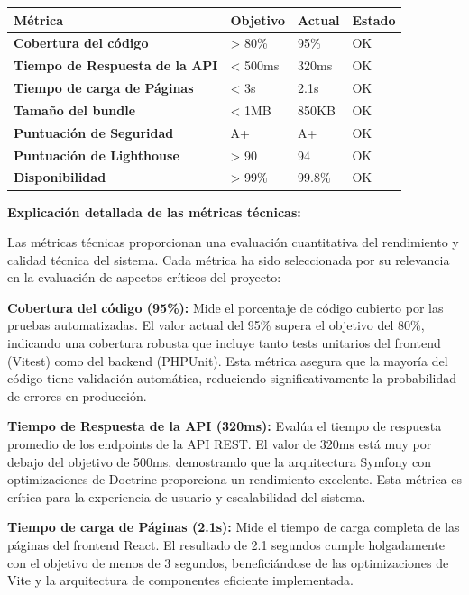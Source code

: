 \documentclass[12pt,a4paper,oneside]{report}
\begin{document}
\begin{longtable}[]{@{}llll@{}}
\toprule\noalign{}
Métrica & Objetivo & Actual & Estado \\
\midrule\noalign{}
\endhead
\bottomrule\noalign{}
\endlastfoot
\textbf{Cobertura del código} & \textgreater{} 80\% & 95\% & OK \\
\textbf{Tiempo de Respuesta de la API} & \textless{} 500ms & 320ms & OK \\
\textbf{Tiempo de carga de Páginas} & \textless{} 3s & 2.1s & OK \\
\textbf{Tamaño del bundle} & \textless{} 1MB & 850KB & OK \\
\textbf{Puntuación de Seguridad} & A+ & A+ & OK \\
\textbf{Puntuación de Lighthouse} & \textgreater{} 90 & 94 & OK \\
\textbf{Disponibilidad} & \textgreater{} 99\% & 99.8\% & OK \\
\end{longtable}

\textbf{Explicación detallada de las métricas técnicas:}

Las métricas técnicas proporcionan una evaluación cuantitativa del rendimiento y calidad técnica del sistema. Cada métrica ha sido seleccionada por su relevancia en la evaluación de aspectos críticos del proyecto:

\textbf{Cobertura del código (95\%):} Mide el porcentaje de código cubierto por las pruebas automatizadas. El valor actual del 95\% supera el objetivo del 80\%, indicando una cobertura robusta que incluye tanto tests unitarios del frontend (Vitest) como del backend (PHPUnit). Esta métrica asegura que la mayoría del código tiene validación automática, reduciendo significativamente la probabilidad de errores en producción.

\textbf{Tiempo de Respuesta de la API (320ms):} Evalúa el tiempo de respuesta promedio de los endpoints de la API REST. El valor de 320ms está muy por debajo del objetivo de 500ms, demostrando que la arquitectura Symfony con optimizaciones de Doctrine proporciona un rendimiento excelente. Esta métrica es crítica para la experiencia de usuario y escalabilidad del sistema.

\textbf{Tiempo de carga de Páginas (2.1s):} Mide el tiempo de carga completa de las páginas del frontend React. El resultado de 2.1 segundos cumple holgadamente con el objetivo de menos de 3 segundos, beneficiándose de las optimizaciones de Vite y la arquitectura de componentes eficiente implementada.
\end{document}
